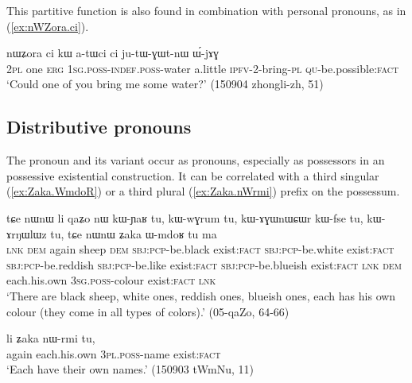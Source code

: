 This partitive function is also found in combination with personal pronouns, as in (\ref{ex:nWZora.ci}).

\begin{exe}
\ex \label{ex:nWZora.ci}
\gll nɯʑora ci kɯ a-tɯci ci ju-tɯ-ɣɯt-nɯ ɯ́-jɤɣ \\
\textsc{2pl} one \textsc{erg} \textsc{1sg}.\textsc{poss}-\textsc{indef}.\textsc{poss}-water a.little \textsc{ipfv}-2-bring-\textsc{pl} \textsc{qu}-be.possible:\textsc{fact} \\
\glt `Could one of you bring me some water?' (150904 zhongli-zh, 51)
\end{exe}

\subsection{Distributive pronouns} \label{sec:distributive.pronouns}
The pronoun  and its variant  occur as pronouns, especially as possessors in an possessive existential construction. It can be correlated with a third singular  (\ref{ex:Zaka.WmdoR}) or a third plural  (\ref{ex:Zaka.nWrmi}) prefix on the possessum.


\begin{exe}
\ex \label{ex:Zaka.WmdoR}
\gll tɕe nɯnɯ li qaʑo nɯ kɯ-ɲaʁ tu, kɯ-wɣrum tu, kɯ-ɤɣɯnɯɕɯr kɯ-fse tu, kɯ-ɤrŋɯlɯz tu, tɕe nɯnɯ ʑaka ɯ-mdoʁ tu ma \\
\textsc{lnk} \textsc{dem} again sheep \textsc{dem} \textsc{sbj}:\textsc{pcp}-be.black exist:\textsc{fact} \textsc{sbj}:\textsc{pcp}-be.white exist:\textsc{fact} \textsc{sbj}:\textsc{pcp}-be.reddish \textsc{sbj}:\textsc{pcp}-be.like exist:\textsc{fact}  \textsc{sbj}:\textsc{pcp}-be.blueish exist:\textsc{fact} \textsc{lnk} \textsc{dem} each.his.own \textsc{3sg}.\textsc{poss}-colour  exist:\textsc{fact} \textsc{lnk} \\
\glt `There are black sheep, white ones, reddish ones, blueish ones, each has his own colour (they come in all types of colors).' (05-qaZo, 64-66)
\end{exe}

\begin{exe}
\ex \label{ex:Zaka.nWrmi}
\gll li ʑaka nɯ-rmi tu, \\
again each.his.own \textsc{3pl}.\textsc{poss}-name exist:\textsc{fact} \\
\glt `Each have their own names.' (150903 tWmNu, 11)
\end{exe}

